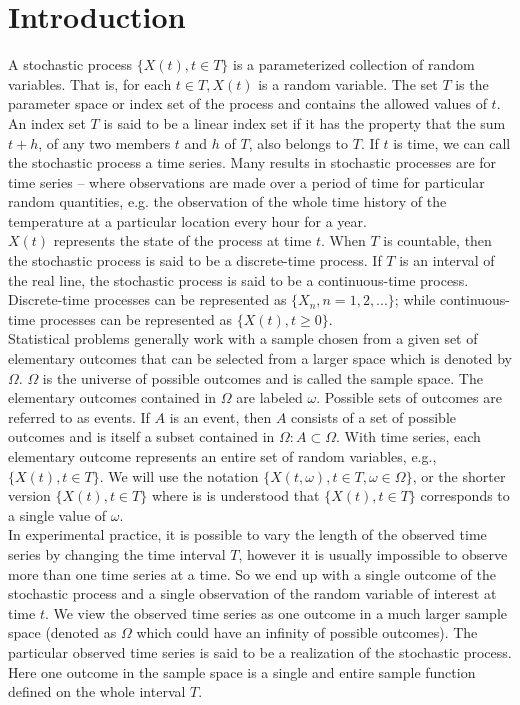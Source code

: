 \section{Introduction}
\label{sec:Introduction}
A stochastic process $\{ X(t), t \in T\}$ is a parameterized collection of random variables. That is, for each $t\in T, X(t)$ is a random variable. The set $T$ is the {\elevenit parameter space} or {\elevenit index set} of the process and contains the allowed values of $t$. An index set $T$ is said to be a {\elevenit linear} index set if it has the property that the sum $t+h$, of any two members $t$ and $h$ of $T$, also belongs to $T$. If $t$ is {\elevenit time}, we can call the stochastic process a {\elevenit time series}.  Many results in stochastic processes are for time series -- where observations are made over a period of time for particular random quantities, e.g. the observation of the whole time history of the temperature at a particular location every hour for a year. \\

$X(t)$ represents the {\elevenit state}\/ of the process at time $t$. When $T$ is countable, then the stochastic process is said to be a {\elevenit discrete-time} process. If $T$ is an interval of the real line, the stochastic process is said to be a {\elevenit continuous-time}\/ process. Discrete-time processes can be represented as $\{X_n, n = 1, 2, ...\}$; while continuous-time processes can be represented as $\{ X(t), t\ge0\}$.\\

Statistical problems generally work with a sample chosen from a given set of elementary outcomes that can be selected from a larger space which is denoted by $\Omega$. $\Omega$ is the universe of possible outcomes and is called the {\elevenit sample space}. The elementary outcomes contained in $\Omega$ are labeled $\omega$. Possible sets of outcomes are referred to as {\elevenit events}. If $A$ is an event, then $A$ consists of a set of possible outcomes and is itself a subset contained in $\Omega: A \subset \Omega$.  With time series, each elementary outcome represents an entire set of random variables, e.g.,  $\{ X(t), t \in T\}$. We will use the notation $\{ X(t, \omega), t\in T, \omega \in \Omega \}$, or the shorter version $\{ X(t), t\in T\}$ where is is understood that $\{ X(t), t\in T\}$  corresponds to a single value of $\omega$.\\

In experimental practice, it is possible to vary the length of the observed time series by changing the time interval $T$, however it is usually impossible to observe more than one time series at a time. So we end up with a single outcome of the stochastic process and a single observation of the random variable of interest at time $t$. We view the observed time series as one outcome in a much larger sample space (denoted as $\Omega$ which could have an infinity of possible outcomes). The particular observed time series is said to be a {\elevenit realization} of the stochastic process. Here one outcome in the sample space is a single and entire sample function defined on the whole interval $T$.\\

